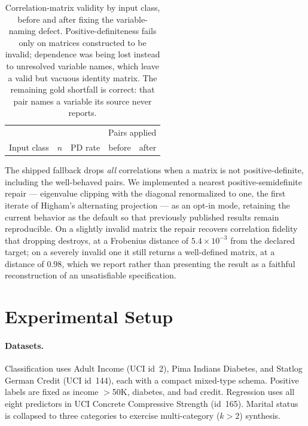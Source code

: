 \documentclass[letterpaper]{article} %
\begin{document}
\begin{table}[t]
\centering
\setlength{\tabcolsep}{4pt}
\begin{tabular}{lrrrr}
\toprule
 & & & \multicolumn{2}{c}{Pairs applied} \\
Input class & $n$ & PD rate & before & after \\
\midrule
%
\end{tabular}
\caption{Correlation-matrix validity by input class, before and after fixing
the variable-naming defect. Positive-definiteness fails only on matrices
constructed to be invalid; dependence was being lost instead to unresolved
variable names, which leave a valid but vacuous identity matrix. The remaining
gold shortfall is correct: that pair names a variable its source never reports.}
\label{tab:corrvalidity}
\end{table}

The shipped fallback drops \emph{all} correlations when a matrix is not
positive-definite, including the well-behaved pairs. We implemented a nearest
positive-semidefinite repair --- eigenvalue clipping with the diagonal
renormalized to one, the first iterate of Higham's alternating projection --- as
an opt-in mode, retaining the current behavior as the default so that previously
published results remain reproducible. On a slightly invalid matrix the repair
recovers correlation fidelity that dropping destroys, at a Frobenius distance of
$5.4{\times}10^{-3}$ from the declared target; on a severely invalid one it
still returns a well-defined matrix, at a distance of $0.98$, which we report
rather than presenting the result as a faithful reconstruction of an
unsatisfiable specification.

\section{Experimental Setup}
\label{app:setup}

\paragraph{Datasets.} Classification uses Adult Income (UCI id~2), Pima
Indians Diabetes, and Statlog German Credit (UCI id~144), each with a compact
mixed-type schema. Positive labels are fixed as income $>$50K, diabetes, and
bad credit. Regression uses all eight predictors in UCI Concrete Compressive
Strength (id~165). Marital status is collapsed to three categories to exercise
multi-category ($k>2$) synthesis.
\end{document}
